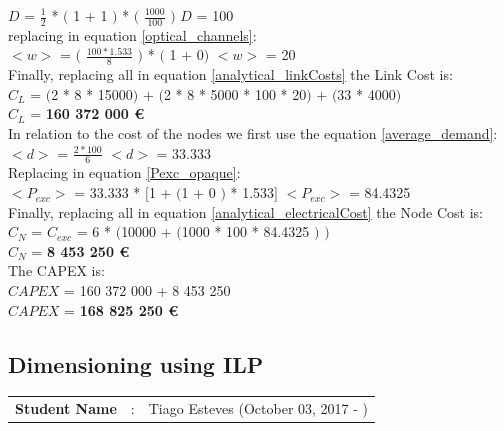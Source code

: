 $D$ = $\frac{1}{2}$ * $($ 1 + 1 $)$ * $($ $\frac{1000}{100}$ $)$ \qquad \qquad $D$ = 100\\

replacing in equation \ref{optical_channels}:\\

$<w>$ = $($ $\frac{100 * 1.533}{8}$ $)$ * $($ 1 + 0$)$ \qquad \quad $<w>$ = 20\\

Finally, replacing all in equation \ref{analytical_linkCosts} the Link Cost is:\\

$C_L$ = $($2 * 8 * 15000$)$ + $($2 * 8 * 5000 * 100 * 20$)$ + $($33 * 4000$)$\\

$C_L$ = \textbf{160 372 000 \euro}\\

In relation to the cost of the nodes we first use the equation \ref{average_demand}:\\

$<d>$ = $\frac{2 * 100}{6}$ \qquad \qquad $<d>$ = 33.333\\

Replacing in equation \ref{Pexc_opaque}:\\

$<P_{exc}>$ = 33.333 * $[$1 + $($1 + $0$ $)$ * 1.533$]$ \qquad \qquad $<P_{exc}>$ = 84.4325 \\

Finally, replacing all in equation \ref{analytical_electricalCost} the Node Cost is:\\

$C_N$ = $C_{exc}$ = 6 * $($10000 + $($1000 * 100 * 84.4325 $)$ $)$\\

$C_N$ = \textbf{8 453 250 \euro}\\

The CAPEX is:\\
$CAPEX$ = 160 372 000 + 8 453 250\\

$CAPEX$ = \textbf{168 825 250 \euro}\\


\subsection{Dimensioning using ILP}
\begin{tcolorbox}	
\begin{tabular}{p{2.75cm} p{0.2cm} p{10.5cm}} 	
\textbf{Student Name}  &:& Tiago Esteves    (October 03, 2017 - )\\
\end{tabular}
\end{tcolorbox}

